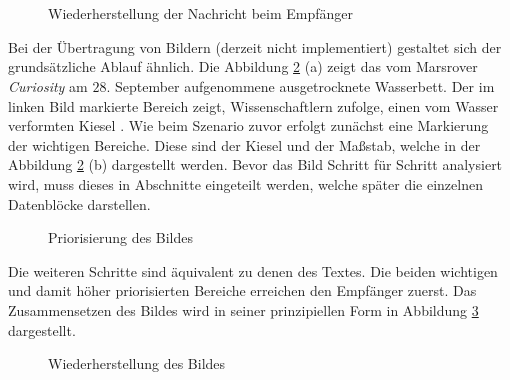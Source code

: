 \begin{figure}[H]
	\centering
	\\
	\\
	\caption{Wiederherstellung der Nachricht beim Empfänger}
	\label{fig:chatguiexample}
\end{figure}

Bei der Übertragung von Bildern (derzeit nicht implementiert) gestaltet sich der
grundsätzliche Ablauf ähnlich. Die Abbildung \ref{fig:marsWaterResidue} (a)
zeigt das vom Marsrover \textit{Curiosity} am $28.$ September aufgenommene
ausgetrocknete Wasserbett. Der im linken Bild markierte Bereich zeigt,
Wissenschaftlern zufolge, einen vom Wasser verformten Kiesel \cite{web11}. Wie
beim Szenario zuvor erfolgt zunächst eine Markierung der wichtigen Bereiche.
Diese sind der Kiesel und der Maßstab, welche in der Abbildung
\ref{fig:marsWaterResidue} (b) dargestellt werden. Bevor das Bild Schritt für
Schritt analysiert wird, muss dieses in Abschnitte eingeteilt werden, welche
später die einzelnen Datenblöcke darstellen.
 
\begin{figure}[H]
	\centering
	\hfill
	\hfill
	\caption[Priorisierung des Bildes]{Priorisierung des Bildes \cite{img3}}
	\label{fig:marsWaterResidue}
\end{figure}

Die weiteren Schritte sind äquivalent zu denen des Textes. Die beiden wichtigen
und damit höher priorisierten Bereiche erreichen den Empfänger zuerst.
Das Zusammensetzen des Bildes wird in seiner prinzipiellen Form in
Abbildung \ref{fig:marsWaterResidueEmpfaenger} dargestellt.

\begin{figure}[H]
	\centering
	\hfill
	\hfill
	\caption{Wiederherstellung des Bildes}
	\label{fig:marsWaterResidueEmpfaenger}
\end{figure}